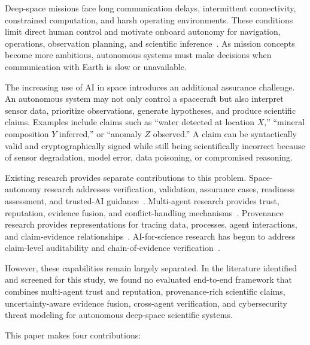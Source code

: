 \documentclass[10pt,conference]{IEEEtran}
\begin{document}
Deep-space missions face long communication delays, intermittent connectivity, constrained computation, and harsh operating environments. These conditions limit direct human control and motivate onboard autonomy for navigation, operations, observation planning, and scientific inference~\cite{cardoso2021review,feather2023assurance,nesnas2021autonomy}. As mission concepts become more ambitious, autonomous systems must make decisions when communication with Earth is slow or unavailable.

The increasing use of AI in space introduces an additional assurance challenge. An autonomous system may not only control a spacecraft but also interpret sensor data, prioritize observations, generate hypotheses, and produce scientific claims. Examples include claims such as ``water detected at location $X$,'' ``mineral composition $Y$ inferred,'' or ``anomaly $Z$ observed.'' A claim can be syntactically valid and cryptographically signed while still being scientifically incorrect because of sensor degradation, model error, data poisoning, or compromised reasoning.

Existing research provides separate contributions to this problem. Space-autonomy research addresses verification, validation, assurance cases, readiness assessment, and trusted-AI guidance~\cite{cardoso2021review,slingerland2022adapting,hobbs2023starl,feather2022assurance,feather2023assurance}. Multi-agent research provides trust, reputation, evidence fusion, and conflict-handling mechanisms~\cite{huynh2006integrated,wang2010evidence,wang2022adaptive}. Provenance research provides representations for tracing data, processes, agent interactions, and claim-evidence relationships~\cite{w3c2013provdm,cantallops2021traceability,souza2025provagent,wang2026agenttraces}. AI-for-science research has begun to address claim-level auditability and chain-of-evidence verification~\cite{meng2026scientistone,rasheed2026fluent}.

However, these capabilities remain largely separated. In the literature identified and screened for this study, we found no evaluated end-to-end framework that combines multi-agent trust and reputation, provenance-rich scientific claims, uncertainty-aware evidence fusion, cross-agent verification, and cybersecurity threat modeling for autonomous deep-space scientific systems.

This paper makes four contributions:
\end{document}
